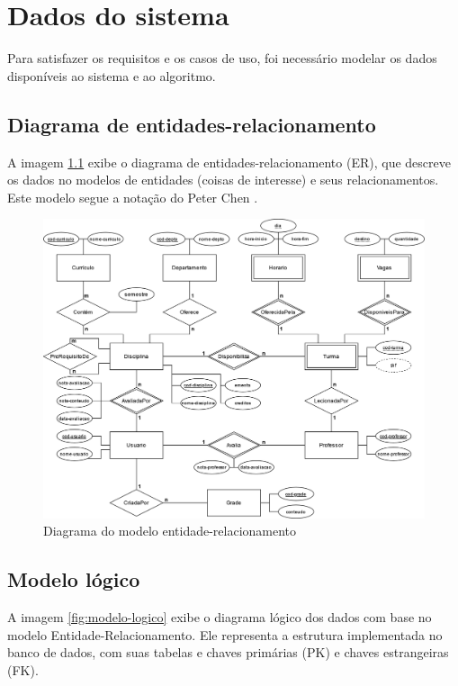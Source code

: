 \chapter{Dados do sistema}
\label{cha:Dados do sistema}

Para satisfazer os requisitos e os casos de uso, foi necessário modelar os dados disponíveis ao sistema e ao algoritmo.

\section{Diagrama de entidades-relacionamento}

A imagem \ref{fig:diagrama-classes} exibe o diagrama de entidades-relacionamento (ER), que descreve os dados no modelos de entidades (coisas de interesse) e seus relacionamentos. Este modelo segue a notação do Peter Chen \cite{peter-chen}. 

\begin{figure}[ht]
    \begin{center}
    \includegraphics[width=390pt]{figuras/diagrama-er-chen.png}
    \caption{Diagrama do modelo entidade-relacionamento}
    \label{fig:diagrama-classes}
    \end{center}
\end{figure}

\section{Modelo lógico}

A imagem \ref{fig:modelo-logico} exibe o diagrama lógico dos dados com base no modelo Entidade-Relacionamento. Ele representa a estrutura implementada no banco de dados, com suas tabelas e chaves primárias (PK) e chaves estrangeiras (FK).


